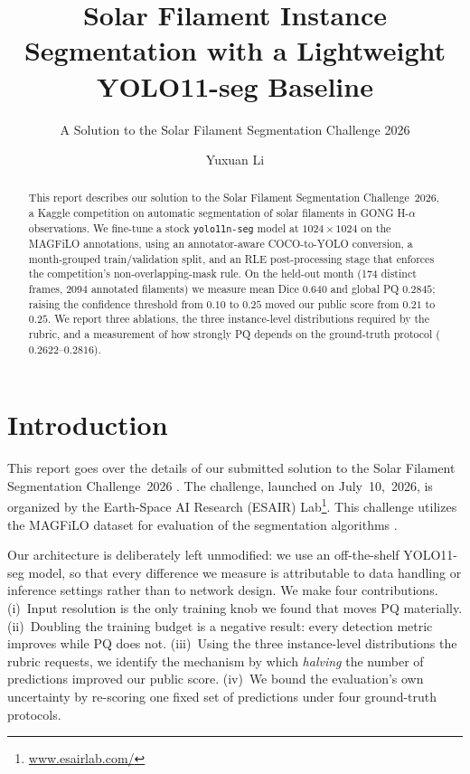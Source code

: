 \documentclass[sigconf]{acmart}
\begin{document}
\title{Solar Filament Instance Segmentation with a Lightweight YOLO11-seg Baseline}
\subtitle{A Solution to the Solar Filament Segmentation Challenge 2026}

\author{Yuxuan Li}

\begin{abstract}
This report describes our solution to the Solar Filament Segmentation Challenge~2026, a Kaggle competition on automatic segmentation of solar filaments in GONG H-$\alpha$ observations.
We fine-tune a stock \texttt{yolo11n-seg} model at $1024\times1024$ on the MAGFiLO annotations, using an annotator-aware COCO-to-YOLO conversion, a month-grouped train/validation split, and an RLE post-processing stage that enforces the competition's non-overlapping-mask rule.
On the held-out month (174 distinct frames, 2094 annotated filaments) we measure mean Dice $0.640$ and global PQ $0.2845$; raising the confidence threshold from $0.10$ to $0.25$ moved our public score from $0.21$ to $0.25$.
We report three ablations, the three instance-level distributions required by the rubric, and a measurement of how strongly PQ depends on the ground-truth protocol ($0.2622$--$0.2816$).
\end{abstract}

\maketitle

\ifguideStyle
{}
\par\medskip
\fi

\section{Introduction}
This report goes over the details of our submitted solution to the Solar Filament Segmentation Challenge~2026 \cite{filament-segmentation-2026}. The challenge, launched on July~10,~2026, is organized by the Earth-Space AI Research (ESAIR) Lab\footnote{\href{https://www.esairlab.com/home}{www.esairlab.com/}}. This challenge utilizes the MAGFiLO dataset for evaluation of the segmentation algorithms \cite{ahmadzadeh2024dataset}.

Our architecture is deliberately left unmodified: we use an off-the-shelf YOLO11-seg model, so that every difference we measure is attributable to data handling or inference settings rather than to network design. We make four contributions. (i)~Input resolution is the only training knob we found that moves PQ materially. (ii)~Doubling the training budget is a negative result: every detection metric improves while PQ does not. (iii)~Using the three instance-level distributions the rubric requests, we identify the mechanism by which \emph{halving} the number of predictions improved our public score. (iv)~We bound the evaluation's own uncertainty by re-scoring one fixed set of predictions under four ground-truth protocols.
\end{document}
